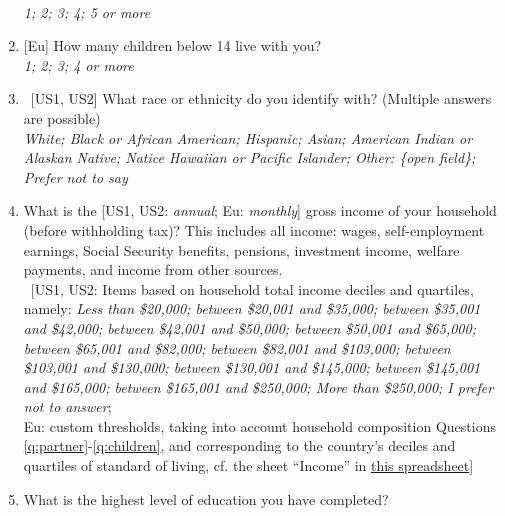 \begin{enumerate}
\\ \textit{1; 2; 3; 4; 5 or more}
\item \label{q:children} [Eu] How many children below 14 live with you?
\\ \textit{1; 2; 3; 4 or more}
\item ~[US1, US2] What race or ethnicity do you identify with? (Multiple answers are possible) 
\\ \textit{White; Black or African American; Hispanic; Asian; American Indian or Alaskan Native; Natice Hawaiian or Pacific Islander; Other: \{open field\}; Prefer not to say}
\item What is the [US1, US2: \textit{annual}; Eu: \textit{monthly}] gross income of your household (before withholding tax)? This includes all income: wages, self-employment earnings, Social Security benefits, pensions, investment income, welfare payments, and income from other sources. %
\\ ~[US1, US2: Items based on household total income deciles and quartiles, namely: \textit{Less than \$20,000; between \$20,001 and \$35,000; between \$35,001 and \$42,000; between \$42,001 and \$50,000; between \$50,001 and \$65,000; between \$65,001 and \$82,000; between \$82,001 and \$103,000; between \$103,001 and \$130,000; between \$130,001 and \$145,000; between \$145,001 and \$165,000; between \$165,001 and \$250,000; More than \$250,000; I prefer not to answer}; \\ Eu: custom thresholds, taking into account household composition Questions \ref{q:partner}-\ref{q:children}, and corresponding to the country's deciles and quartiles of standard of living, cf. the sheet ``Income'' in \href{https://github.com/bixiou/global_tax_attitudes/raw/main/questionnaire/specificities.xlsx}{this spreadsheet}]
\item What is the highest level of education you have completed? 

\end{enumerate}

